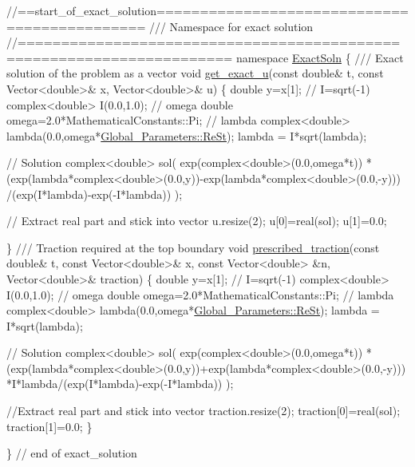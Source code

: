  
\begin{DoxyCodeInclude}
\textcolor{comment}{//==start\_of\_exact\_solution=============================================}
\textcolor{comment}{/// Namespace for exact solution}
\textcolor{comment}{}\textcolor{comment}{//======================================================================}
\textcolor{keyword}{namespace }\hyperlink{namespaceExactSoln}{ExactSoln}
\{
 \textcolor{comment}{}
\textcolor{comment}{ /// Exact solution of the problem as a vector}
\textcolor{comment}{} \textcolor{keywordtype}{void} \hyperlink{namespaceExactSoln_a2598550281dd62f4160edb3d0b2e5432}{get\_exact\_u}(\textcolor{keyword}{const} \textcolor{keywordtype}{double}& t, \textcolor{keyword}{const} Vector<double>& x, Vector<double>& u)
 \{
  \textcolor{keywordtype}{double} y=x[1];
  \textcolor{comment}{// I=sqrt(-1)}
  complex<double> I(0.0,1.0);
  \textcolor{comment}{// omega}
  \textcolor{keywordtype}{double} omega=2.0*MathematicalConstants::Pi;
  \textcolor{comment}{// lambda}
  complex<double> lambda(0.0,omega*\hyperlink{namespaceGlobal__Parameters_a7a59a32365e87566069e458dc83bd18a}{Global\_Parameters::ReSt});
  lambda = I*sqrt(lambda);

  \textcolor{comment}{// Solution}
  complex<double> sol(
   exp(complex<double>(0.0,omega*t)) * 
   (exp(lambda*complex<double>(0.0,y))-exp(lambda*complex<double>(0.0,-y)))
   /(exp(I*lambda)-exp(-I*lambda)) );
  
  \textcolor{comment}{// Extract real part and stick into vector}
  u.resize(2);
  u[0]=real(sol);
  u[1]=0.0;

 \}
\textcolor{comment}{}
\textcolor{comment}{ /// Traction required at the top boundary}
\textcolor{comment}{} \textcolor{keywordtype}{void} \hyperlink{namespaceExactSoln_a2a77269d59d7cf56364f0c3b5ae13b41}{prescribed\_traction}(\textcolor{keyword}{const} \textcolor{keywordtype}{double}& t,
                          \textcolor{keyword}{const} Vector<double>& x,
                          \textcolor{keyword}{const} Vector<double> &n,
                          Vector<double>& traction)
 \{
  \textcolor{keywordtype}{double} y=x[1];
  \textcolor{comment}{// I=sqrt(-1)}
  complex<double> I(0.0,1.0);
  \textcolor{comment}{// omega}
  \textcolor{keywordtype}{double} omega=2.0*MathematicalConstants::Pi;
  \textcolor{comment}{// lambda}
  complex<double> lambda(0.0,omega*\hyperlink{namespaceGlobal__Parameters_a7a59a32365e87566069e458dc83bd18a}{Global\_Parameters::ReSt});
  lambda = I*sqrt(lambda);

  \textcolor{comment}{// Solution}
  complex<double> sol(
   exp(complex<double>(0.0,omega*t)) * 
   (exp(lambda*complex<double>(0.0,y))+exp(lambda*complex<double>(0.0,-y)))
   *I*lambda/(exp(I*lambda)-exp(-I*lambda)) );
   
  \textcolor{comment}{//Extract real part and stick into vector}
  traction.resize(2);
  traction[0]=real(sol);
  traction[1]=0.0;
 \} 

\}  \textcolor{comment}{// end of exact\_solution}

\end{DoxyCodeInclude}




